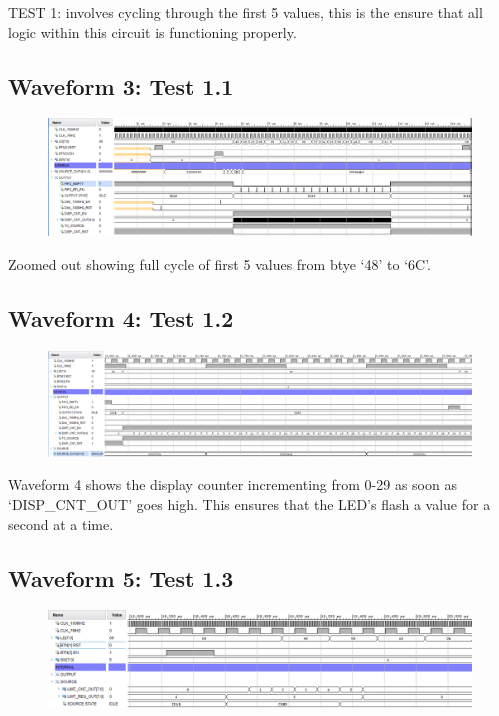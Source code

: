 \documentclass[11pt]{report}
\begin{document}
TEST 1: involves cycling through the first 5 values, this is the ensure that
all logic within this circuit is functioning properly.

\subsection*{Waveform 3: Test 1.1 }
\begin{figure}[H]
       \includegraphics[width=\columnwidth]{Assets/Test1_1.png}
\end{figure}

Zoomed out showing full cycle of first 5 values from btye `48' to `6C'.

\subsection*{Waveform 4: Test 1.2 }
\begin{figure}[H]
       \includegraphics[width=\columnwidth]{Assets/Test1_2.png}
\end{figure}

Waveform 4 shows the display counter incrementing from 0-29 as soon as `DISP\_CNT\_OUT' goes high. This ensures that the
LED's flash a value for a second at a time.

\subsection*{Waveform 5: Test 1.3 }
\begin{figure}[H]
       \includegraphics[width=\columnwidth]{Assets/Test1_3.png}
\end{figure}
\end{document}
